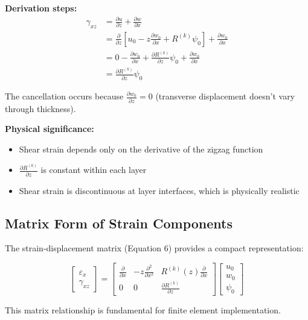 \documentclass[12pt,a4paper]{article}
\begin{document}
\textbf{Derivation steps:}
\begin{align}
\gamma_{xz} &= \frac{\partial u}{\partial z} + \frac{\partial w}{\partial x} \\
&= \frac{\partial}{\partial z} \left[ u_0 - z\frac{\partial w_0}{\partial x} + R^{(k)}\psi_0 \right] + \frac{\partial w_0}{\partial x} \\
&= 0 - \frac{\partial w_0}{\partial x} + \frac{\partial R^{(k)}}{\partial z}\psi_0 + \frac{\partial w_0}{\partial x} \\
&= \frac{\partial R^{(k)}}{\partial z}\psi_0
\end{align}

The cancellation occurs because $\frac{\partial w_0}{\partial z} = 0$ (transverse displacement doesn't vary through thickness).

\textbf{Physical significance:}
\begin{itemize}
\item Shear strain depends only on the derivative of the zigzag function
\item $\frac{\partial R^{(k)}}{\partial z}$ is constant within each layer
\item Shear strain is discontinuous at layer interfaces, which is physically realistic
\end{itemize}

\subsection{Matrix Form of Strain Components}

The strain-displacement matrix (Equation 6) provides a compact representation:

\begin{equation}
\begin{bmatrix} \varepsilon_x \\ \gamma_{xz} \end{bmatrix} =
\begin{bmatrix}
\frac{\partial}{\partial x} & -z \frac{\partial^2}{\partial x^2} & R^{(k)}(z) \frac{\partial}{\partial x} \\
0 & 0 & \frac{\partial R^{(k)}}{\partial z}
\end{bmatrix}
\begin{bmatrix} u_0 \\ w_0 \\ \psi_0 \end{bmatrix}
\end{equation}

This matrix relationship is fundamental for finite element implementation.
\end{document}
